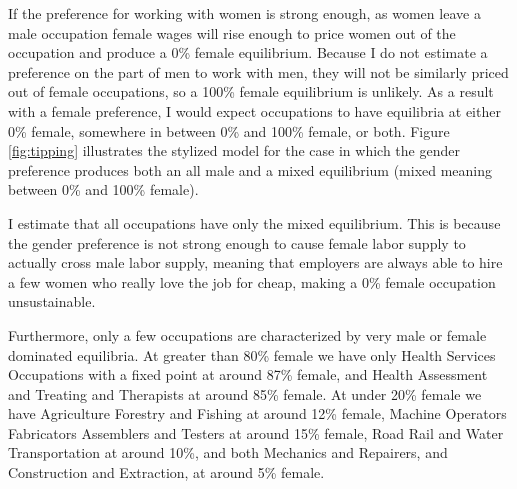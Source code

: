\documentclass[12pt]{article}
\begin{document}
If the preference for working with women is strong enough, as women leave a male occupation female wages will rise enough to price women out of the occupation and produce a 0\% female equilibrium. Because I do not estimate a preference on the part of men to work with men, they will not be similarly priced out of female occupations, so a 100\% female equilibrium is unlikely. As a result with a female preference, I would expect occupations to have equilibria at either 0\% female, somewhere in between 0\% and 100\% female, or both. Figure \ref{fig:tipping} illustrates the stylized model for the case in which the gender preference produces both an all male and a mixed equilibrium (mixed meaning between 0\% and 100\% female). 



I estimate that all occupations have only the mixed equilibrium. This is because the gender preference is not strong enough to cause female labor supply to actually cross male labor supply, meaning that employers are always able to hire a few women who really love the job for cheap, making a 0\% female occupation unsustainable.


Furthermore, only a few occupations are characterized by very male or female dominated equilibria. At greater than 80\% female we have only Health Services Occupations with a fixed point at around 87\% female, and Health Assessment and Treating and Therapists at around 85\% female. At under 20\% female we have Agriculture Forestry and Fishing at around 12\% female, Machine Operators Fabricators Assemblers and Testers at around 15\% female, Road Rail and Water Transportation at around 10\%, and both Mechanics and Repairers, and Construction and Extraction, at around 5\% female.
\end{document}
